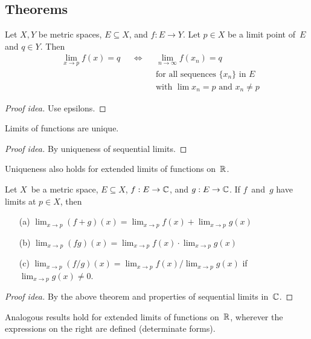 \subsection*{Theorems}
\begin{thm}
Let \(X,Y\) be metric spaces, \(E\subseteq X\), and \(f:E\to Y\). Let \(p\in X\) be a limit point of~\(E\) and \(q\in Y\). Then
\begin{align*}
&\lim_{x\to p}f(x)=q&&\iff&&\lim_{n\to\infty}f(x_n)=q\\
&&&&&\text{for all sequences }\{x_n\}\text{ in }E\\
&&&&&\text{with }\lim x_n=p\text{ and }x_n\ne p
\end{align*}
\end{thm}
\begin{proof}[Proof idea]
Use epsilons.
\end{proof}

\begin{cor}
Limits of functions are unique.
\end{cor}
\begin{proof}[Proof idea]
By uniqueness of sequential limits.
\end{proof}
\begin{rmk}
Uniqueness also holds for extended limits of functions on~\(\mathbb{R}\).
\end{rmk}

\begin{thm}
Let \(X\)~be a metric space, \(E\subseteq X\), \(f:E\to\mathbb{C}\), and \(g:E\to\mathbb{C}\). If \(f\)~and~\(g\) have limits at \(p\in X\), then
\begin{enumerate}[itemsep=0pt]
\item[(a)] \(\lim_{x\to p}(f+g)(x)=\lim_{x\to p}f(x)+\lim_{x\to p}g(x)\)
\item[(b)] \(\lim_{x\to p}(fg)(x)=\lim_{x\to p}f(x)\cdot\lim_{x\to p}g(x)\)
\item[(c)] \(\lim_{x\to p}(f/g)(x)=\lim_{x\to p}f(x)/\lim_{x\to p}g(x)\) if \(\lim_{x\to p}g(x)\ne0\).
\end{enumerate}
\end{thm}
\begin{proof}[Proof idea]
By the above theorem and properties of sequential limits in~\(\mathbb{C}\).
\end{proof}

\begin{rmk}
Analogous results hold for extended limits of functions on~\(\mathbb{R}\), wherever the expressions on the right are defined (determinate forms).
\end{rmk}

